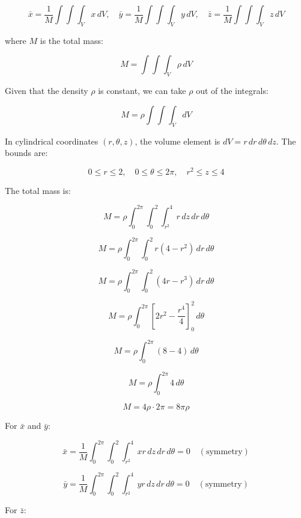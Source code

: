 \documentclass{article}
\begin{document}
\[
\bar{x} = \frac{1}{M} \int \int \int_{V} x \, dV, \quad \bar{y} = \frac{1}{M} \int \int \int_{V} y \, dV, \quad \bar{z} = \frac{1}{M} \int \int \int_{V} z \, dV
\]


where \(M\) is the total mass:


\[
M = \int \int \int_{V} \rho \, dV
\]



Given that the density \(\rho\) is constant, we can take \(\rho\) out of the integrals:


\[
M = \rho \int \int \int_{V} dV
\]



In cylindrical coordinates \((r, \theta, z)\), the volume element is \(dV = r \, dr \, d\theta \, dz\). The bounds are:


\[
0 \leq r \leq 2, \quad 0 \leq \theta \leq 2\pi, \quad r^2 \leq z \leq 4
\]



The total mass is:


\[
M = \rho \int_{0}^{2\pi} \int_{0}^{2} \int_{r^2}^{4} r \, dz \, dr \, d\theta
\]




\[
M = \rho \int_{0}^{2\pi} \int_{0}^{2} r (4 - r^2) \, dr \, d\theta
\]




\[
M = \rho \int_{0}^{2\pi} \int_{0}^{2} (4r - r^3) \, dr \, d\theta
\]




\[
M = \rho \int_{0}^{2\pi} \left[ 2r^2 - \frac{r^4}{4} \right]_0^2 \, d\theta
\]




\[
M = \rho \int_{0}^{2\pi} \left( 8 - 4 \right) \, d\theta
\]




\[
M = \rho \int_{0}^{2\pi} 4 \, d\theta
\]




\[
M = 4\rho \cdot 2\pi = 8\pi\rho
\]



For \(\bar{x}\) and \(\bar{y}\):


\[
\bar{x} = \frac{1}{M} \int_{0}^{2\pi} \int_{0}^{2} \int_{r^2}^{4} x r \, dz \, dr \, d\theta = 0 \quad (\text{symmetry})
\]




\[
\bar{y} = \frac{1}{M} \int_{0}^{2\pi} \int_{0}^{2} \int_{r^2}^{4} y r \, dz \, dr \, d\theta = 0 \quad (\text{symmetry})
\]



For \(\bar{z}\):
\end{document}

